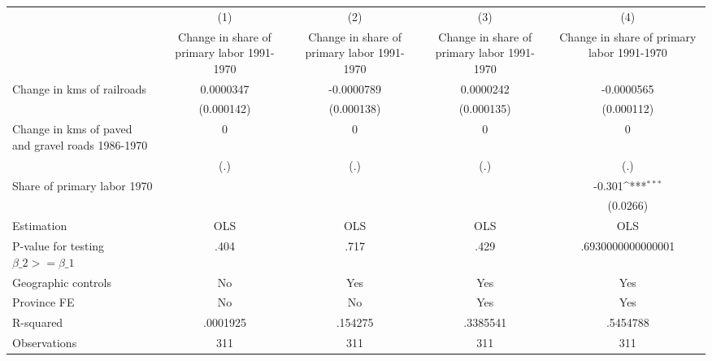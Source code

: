 {
\def\sym#1{\ifmmode^{#1}\else\(^{#1}\)\fi}
\begin{tabular}{l*{4}{c}}
\hline\hline
                &\multicolumn{1}{c}{(1)}&\multicolumn{1}{c}{(2)}&\multicolumn{1}{c}{(3)}&\multicolumn{1}{c}{(4)}\\
                &\multicolumn{1}{c}{Change in share of primary labor 1991-1970}&\multicolumn{1}{c}{Change in share of primary labor 1991-1970}&\multicolumn{1}{c}{Change in share of primary labor 1991-1970}&\multicolumn{1}{c}{Change in share of primary labor 1991-1970}\\
\hline
Change in kms of railroads&0.0000347         &-0.0000789         &0.0000242         &-0.0000565         \\
                &(0.000142)         &(0.000138)         &(0.000135)         &(0.000112)         \\
[1em]
Change in kms of paved and gravel roads 1986-1970&        0         &        0         &        0         &        0         \\
                &      (.)         &      (.)         &      (.)         &      (.)         \\
[1em]
Share of primary labor 1970&                  &                  &                  &   -0.301\sym{***}\\
                &                  &                  &                  & (0.0266)         \\
\hline
Estimation      &      OLS         &      OLS         &      OLS         &      OLS         \\
P-value for testing $\beta\_2 >= \beta\_1$&     .404         &     .717         &     .429         &.6930000000000001         \\
Geographic controls&       No         &      Yes         &      Yes         &      Yes         \\
Province FE     &       No         &       No         &      Yes         &      Yes         \\
R-squared       & .0001925         &  .154275         & .3385541         & .5454788         \\
Observations    &      311         &      311         &      311         &      311         \\
\hline\hline
\end{tabular}
}

